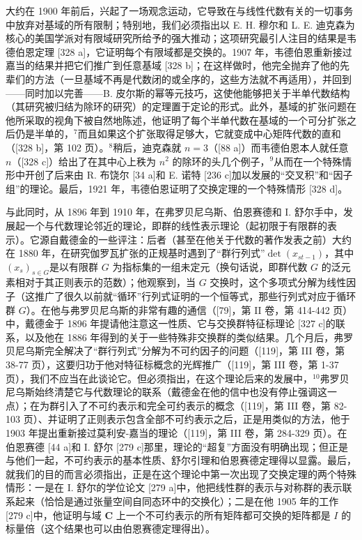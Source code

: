 大约在 1900 年前后，兴起了一场观念运动，它导致在与线性代数有关的一切事务中放弃对基域的所有限制；特别地，我们必须指出以 E. H. 穆尔和 L. E. 迪克森为核心的美国学派对有限域研究所给予的强大推动；这项研究最引人注目的结果是韦德伯恩定理 {[}328 a{]}，它证明每个有限域都是交换的。1907 年，韦德伯恩重新接过嘉当的结果并把它们推广到任意基域 {[}328 b{]}；在这样做时，他完全抛弃了他的先辈们的方法（一旦基域不再是代数闭的或全序的，这些方法就不再适用），并回到——同时加以完善——B. 皮尔斯的幂等元技巧，这使他能够把关于半单代数结构（其研究被归结为除环的研究）的定理置于定论的形式。此外，基域的扩张问题在他所采取的视角下被自然地陈述，他证明了每个半单代数在基域的一个可分扩张之后仍是半单的，\(^{7}\)而且如果这个扩张取得足够大，它就变成中心矩阵代数的直和（{[}328 b{]}，第 102 页）。\(^{8}\)稍后，迪克森就 \(n = 3\)（{[}88 a{]}）而韦德伯恩本人就任意 \(n\)（{[}328 c{]}）给出了在其中心上秩为 \(n^{2}\) 的除环的头几个例子，\(^{9}\)从而在一个特殊情形中开创了后来由 R. 布饶尔 {[}34 a{]}和 E. 诺特 {[}236 c{]}加以发展的“交叉积”和“因子组”的理论。最后，1921 年，韦德伯恩证明了交换定理的一个特殊情形 {[}328 d{]}。

与此同时，从 1896 年到 1910 年，在弗罗贝尼乌斯、伯恩赛德和 I. 舒尔手中，发展起一个与代数理论邻近的理论，即群的线性表示理论（起初限于有限群的表示）。它源自戴德金的一些评注：后者（甚至在他关于代数的著作发表之前）大约在 1880 年，在研究伽罗瓦扩张的正规基时遇到了“群行列式”\(\det(x_{st-1})\)，其中 \((x_s)_{s \in G}\)是以有限群 \(G\) 为指标集的一组未定元（换句话说，即群代数 \(G\) 的泛元素相对于其正则表示的范数）；他观察到，当 \(G\) 交换时，这个多项式分解为线性因子（这推广了很久以前就“循环”行列式证明的一个恒等式，那些行列式对应于循环群 \(G\)）。在他与弗罗贝尼乌斯的非常有趣的通信（{[}79{]}，第 II 卷，第 414-442 页）中，戴德金于 1896 年提请他注意这一性质、它与交换群特征标理论 {[}327 c{]}的联系，以及他在 1886 年得到的关于一些特殊非交换群的类似结果。几个月后，弗罗贝尼乌斯完全解决了“群行列式”分解为不可约因子的问题（{[}119{]}，第 III 卷，第 38-77 页），这要归功于他对特征标概念的光辉推广（{[}119{]}，第 III 卷，第 1-37 页），我们不应当在此谈论它。但必须指出，在这个理论后来的发展中，\(^{10}\)弗罗贝尼乌斯始终清楚它与代数理论的联系（戴德金在他的信中也没有停止强调这一点）；在为群引入了不可约表示和完全可约表示的概念（{[}119{]}，第 III 卷，第 82-103 页）、并证明了正则表示包含全部不可约表示之后，正是用类似的方法，他于 1903 年提出重新接过莫利安-嘉当的理论（{[}119{]}，第 III 卷，第 284-329 页）。在伯恩赛德 {[}44 a{]}和 I. 舒尔 {[}279 c{]}那里，理论的“超复”方面没有明确出现；但正是与他们一起，不可约表示的基本性质、舒尔引理和伯恩赛德定理得以显露。最后，就我们的目的而言必须指出，正是在这个理论中第一次出现了交换定理的两个特殊情形：一是在 I. 舒尔的学位论文 {[}279 a{]}中，他把线性群的表示与对称群的表示联系起来（恰恰是通过张量空间自同态环中的交换化）；二是在他 1905 年的工作 {[}279 c{]}中，他证明与域 \(\mathbf{C}\) 上一个不可约表示的所有矩阵都可交换的矩阵都是 \(I\) 的标量倍（这个结果也可以由伯恩赛德定理得出）。

